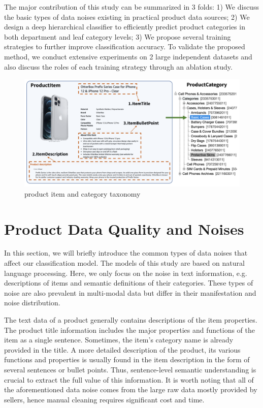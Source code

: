 \documentclass[11pt,dvipsnames]{article}
\begin{document}
The major contribution of this study can be summarized in 3 folds: 1) We discuss the basic types of data noises existing in practical product data sources; 2) We design a deep hierarchical classifier to efficiently predict product categories in both department and leaf category levels; 3) We propose several training strategies to further improve classification accuracy. To validate the proposed method, we conduct extensive experiments on 2 large independent datasets and also discuss the roles of each training strategy through an ablation study.  

\begin{figure}[h]
\center
        \includegraphics[width=0.8\linewidth]{figures/Data_Category-pdf.png}
    \caption{product item and category taxonomy}
    \label{fig:itemexample}
\end{figure}

\section{Product Data Quality and Noises}\label{sec:noise}
In this section, we will briefly introduce the common types of data noises that affect our classification model. The models of this study are based on natural language processing. Here, we only focus on the noise in text information, e.g. descriptions of items and semantic definitions of their categories. These types of noise are also prevalent in multi-modal data but differ in their manifestation and noise distribution. 

The text data of a product generally contains descriptions of the item properties. The product title information includes the major properties and functions of the item as a single sentence. Sometimes, the item’s category name is already provided in the title. A more detailed description of the product, its various functions and properties is usually found in the item description in the form of several sentences or bullet points. Thus, sentence-level semantic understanding is crucial to extract the full value of this information. It is worth noting that all of the aforementioned data noise comes from the large raw data mostly provided by sellers, hence manual cleaning requires significant cost and time. 
\end{document}
